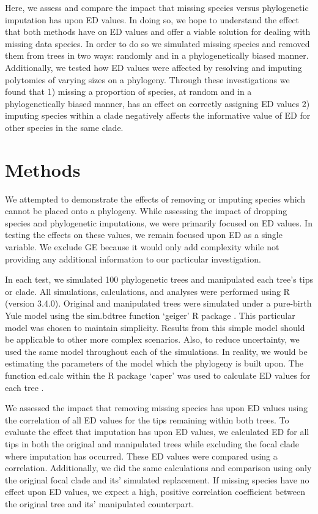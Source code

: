 \documentclass[12pt,english]{article}
\begin{document}
Here, we assess and compare the impact that missing species versus phylogenetic
imputation has upon ED values. In doing so, we hope to understand the effect
that both methods have on ED values and offer a viable solution for dealing with
missing data species. In order to do so we simulated missing species and removed
them from trees in two ways: randomly and in a phylogenetically biased manner.
Additionally, we tested how ED values were affected by resolving and imputing
polytomies of varying sizes on a phylogeny. Through these investigations we
found that 1) missing a proportion of species, at random and in a
phylogenetically biased manner, has an effect on correctly assigning ED values
2) imputing species within a clade negatively affects the informative value of
ED for other species in the same clade.  

\section*{Methods}
We attempted to demonstrate the effects of removing or imputing
species which cannot be placed onto a phylogeny. While assessing the
impact of dropping species and phylogenetic imputations, we were
primarily focused on ED values. In testing the effects on these
values, we remain focused upon ED as a single variable. We exclude GE
because it would only add complexity while not providing any
additional information to our particular investigation.

In each test, we simulated 100 phylogenetic trees and manipulated each
tree’s tips or clade. All simulations, calculations, and analyses were
performed using R (version 3.4.0). Original and manipulated trees were
simulated under a pure-birth Yule model using the sim.bdtree function
‘geiger’ R package \autocite{Harmon2007}. This particular model was
chosen to maintain simplicity. Results from this simple model should
be applicable to other more complex scenarios. Also, to reduce
uncertainty, we used the same model throughout each of the
simulations. In reality, we would be estimating the parameters of the
model which the phylogeny is built upon. The function ed.calc within
the R package ‘caper’ was used to calculate ED values for each tree
\autocite{Orme2013}.

We assessed the impact that removing missing species has upon ED
values using the correlation of all ED values for the tips remaining
within both trees. To evaluate the effect that imputation has upon ED
values, we calculated ED for all tips in both the original and
manipulated trees while excluding the focal clade where imputation has
occurred. These ED values were compared using a
correlation. Additionally, we did the same calculations and comparison
using only the original focal clade and its’ simulated replacement. If
missing species have no effect upon ED values, we expect a high,
positive correlation coefficient between the original tree and its’
manipulated counterpart.
\end{document}
